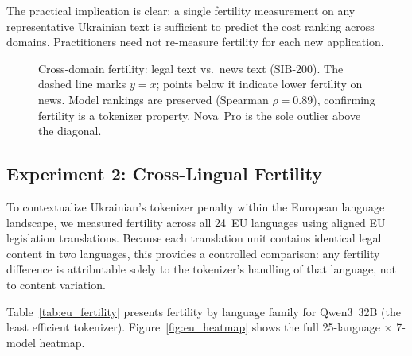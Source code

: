 \documentclass[11pt,a4paper]{article}
\begin{document}
The practical implication is clear: a single fertility measurement on any representative Ukrainian text is sufficient to predict the cost ranking across domains. Practitioners need not re-measure fertility for each new application.

\begin{figure}[t]
\centering

\caption{Cross-domain fertility: legal text \citep{ovcharov2026tokenizer} vs.\ news text (SIB-200). The dashed line marks $y = x$; points below it indicate lower fertility on news. Model rankings are preserved (Spearman $\rho = 0.89$), confirming fertility is a tokenizer property. Nova~Pro is the sole outlier above the diagonal.}
\label{fig:crossdomain}
\end{figure}

\subsection{Experiment 2: Cross-Lingual Fertility}
\label{sec:exp2}

To contextualize Ukrainian's tokenizer penalty within the European language landscape, we measured fertility across all 24~EU languages using aligned EU legislation translations. Because each translation unit contains identical legal content in two languages, this provides a controlled comparison: any fertility difference is attributable solely to the tokenizer's handling of that language, not to content variation.

Table~\ref{tab:eu_fertility} presents fertility by language family for Qwen3~32B (the least efficient tokenizer). Figure~\ref{fig:eu_heatmap} shows the full 25-language $\times$ 7-model heatmap.
\end{document}
